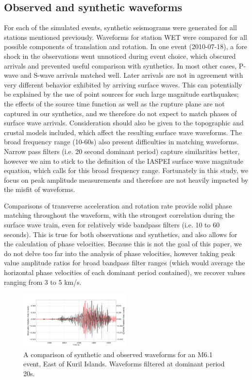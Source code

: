 \documentclass{gji}
\begin{document}
\subsection{Observed and synthetic waveforms}
For each of the simulated events, synthetic seismograms were generated for all stations mentioned previously. Waveforms for station WET were compared for all possible components of translation and rotation. In one event (2010-07-18), a fore shock in the observations went unnoticed during event choice, which obscured arrivals and prevented useful comparison with synthetics. In most other cases, P-wave and S-wave arrivals matched well. Later arrivals are not in agreement with very different behavior exhibited by arriving surface waves. This can potentially be explained by the use of point sources for such large magnitude earthquakes; the effects of the source time function as well as the rupture plane are not captured in our synthetics, and we therefore do not expect to match phases of surface wave arrivals. Consideration should also be given to the topographic and crustal models included, which affect the resulting surface wave waveforms. The broad frequency range (10-60s) also present difficulties in matching waveforms. Narrow pass filters (i.e. 20 second dominant period) capture similarities better, however we aim to stick to the definition of the IASPEI surface wave magnitude equation, which calls for this broad frequency range. Fortunately in this study, we focus on peak amplitude measurements and therefore are not heavily impacted by the misfit of waveforms.


Comparisons of transverse acceleration and rotation rate provide solid phase matching throughout the waveform, with the strongest correlation during the surface wave train, even for relatively wide bandpass filters (i.e. 10 to 60 seconds). This is true for both observations and synthetics, and also allows for the calculation of phase velocities. Because this is not the goal of this paper, we do not delve too far into the analysis of phase velocities, however taking peak value amplitude ratios for broad bandpass filter ranges (which would average the horizontal phase velocities of each dominant period contained), we recover values ranging from 3 to 5 km/s. 

\begin{figure}
\centerline{\includegraphics[width=0.5\textwidth]{C201304191958A_10-60_rotationrate_compare}}
\caption{A comparison of synthetic and observed waveforms for an M6.1 event, East of Kuril Islands. Waveforms filtered at dominant period 20s.}
\label{fig:both}
\end{figure}
\end{document}
